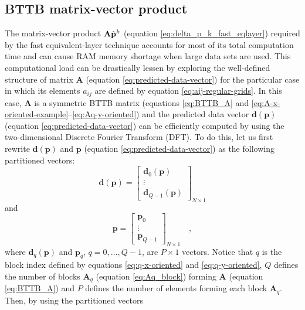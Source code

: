 \subsection{BTTB matrix-vector product}

The matrix-vector product $\tensor{A} \hat{\mathbf{p}}^{k}$ (equation 
\ref{eq:delta_p_k_fast_eqlayer}) required by the fast equivalent-layer 
technique \citep{siqueira-etal2017} accounts for most of its total computation time 
and can cause RAM memory shortage when large data sets are used.
This computational load can be drastically lessen by exploring the well-defined structure of 
matrix $\mathbf{A}$ (equation \ref{eq:predicted-data-vector}) for the particular case in which 
its elements $a_{ij}$ are defined by equation \ref{eq:aij-regular-grids}. 
In this case, $\mathbf{A}$ is a symmetric BTTB matrix (equations \ref{eq:BTTB_A} and 
\ref{eq:A-x-oriented-example}--\ref{eq:Aq-y-oriented}) and the predicted data vector 
$\mathbf{d}(\mathbf{p})$ (equation \ref{eq:predicted-data-vector}) can be efficiently
computed by using the two-dimensional Discrete Fourier Transform (DFT).
To do this, let us first rewrite $\mathbf{d}(\mathbf{p})$ and
$\mathbf{p}$ (equation \ref{eq:predicted-data-vector}) as the following partitioned vectors:
\begin{equation}
\mathbf{d}(\mathbf{p}) = \begin{bmatrix}
\mathbf{d}_{0}(\mathbf{p}) \\
\vdots \\
\mathbf{d}_{Q - 1}(\mathbf{p})
\end{bmatrix}_{N \times 1}
\label{eq:predicted-data-vector-partitioned}
\end{equation}
and
\begin{equation}
\mathbf{p} = \begin{bmatrix}
\mathbf{p}_{0} \\
\vdots \\
\mathbf{p}_{Q - 1}
\end{bmatrix}_{N \times 1} \quad ,
\label{eq:parameter-vector-partitioned}
\end{equation}
where $\mathbf{d}_{q}(\mathbf{p})$ and $\mathbf{p}_{q}$, $q = 0, \dots, Q - 1$,
are $P \times 1$ vectors. Notice that $q$ is the block index defined by equations 
\ref{eq:q-x-oriented} and \ref{eq:q-y-oriented}, $Q$ defines the number of blocks
$\mathbf{A}_{q}$ (equation \ref{eq:Aq_block}) forming $\mathbf{A}$ (equation \ref{eq:BTTB_A}) 
and $P$ defines the number of elements forming each block $\mathbf{A}_{q}$.
Then, by using the partitioned vectors 

